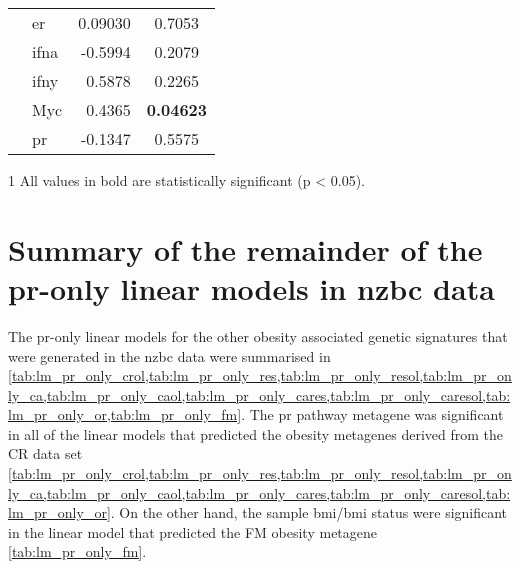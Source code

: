 \begin{table}[htpb]
\begin{threeparttable}
\begin{tabular}{llrc}
                                                                           & \gls{er}   & 0.09030  & 0.7053 \\
                                                                           & \gls{ifna} & -0.5994  & 0.2079 \\
                                                                           & \gls{ifny} & 0.5878   & 0.2265 \\
                                                                           & Myc        & 0.4365   & \bfseries{0.04623} \\
                                                                           & \gls{pr}   & -0.1347  & 0.5575 \\
				\hline
				\hline
			\end{tabular}
			\begin{tablenotes}
				\begin{footnotesize}
				\item [1] All values in bold are statistically significant (p \textless{} 0.05).
				\end{footnotesize}
			\end{tablenotes}
		\end{threeparttable}
	\end{table}

	\newpage

	\section{Summary of the remainder of the \gls{pr}-only linear models in \gls{nzbc} data}
	\label{sec:summary_of_the_pr_linear_models_in_nzbc_data}

	The \gls{pr}-only linear models for the other obesity associated genetic signatures that were generated in the \gls{nzbc} data were summarised in \cref{tab:lm_pr_only_crol,tab:lm_pr_only_res,tab:lm_pr_only_resol,tab:lm_pr_only_ca,tab:lm_pr_only_caol,tab:lm_pr_only_cares,tab:lm_pr_only_caresol,tab:lm_pr_only_or,tab:lm_pr_only_fm}.
	The \gls{pr} pathway metagene was significant in all of the linear models that predicted the obesity metagenes derived from the CR data set \cref{tab:lm_pr_only_crol,tab:lm_pr_only_res,tab:lm_pr_only_resol,tab:lm_pr_only_ca,tab:lm_pr_only_caol,tab:lm_pr_only_cares,tab:lm_pr_only_caresol,tab:lm_pr_only_or}.
	On the other hand, the sample \gls{bmi}/\gls{bmi} status were significant in the linear model that predicted the FM obesity metagene \cref{tab:lm_pr_only_fm}.

